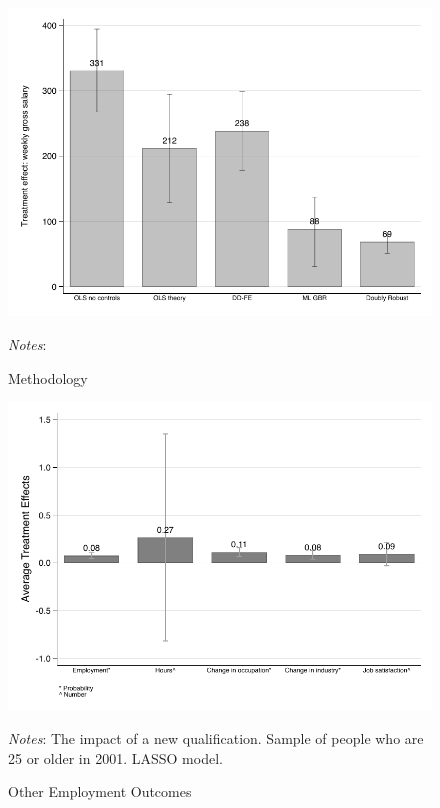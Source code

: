\documentclass[12pt, a4paper]{article}
\begin{document}



\clearpage

\begin{figure}[htbp]
\centering
\caption{Methodology}
\vspace{0.5cm}
  \label{fig:method}
    \includegraphics{_figures/method_v2.pdf}
\parbox{1\textwidth}{\footnotesize{\textit{Notes}: }}
\end{figure}

\begin{figure}[htbp]
\centering
\caption{Other Employment Outcomes}
\vspace{0.5cm}
  \label{fig:empl}
    \includegraphics{_figures/SPRC_fig5_empltr.pdf}
\parbox{1\textwidth}{\footnotesize{\textit{Notes}: The impact of a new qualification. Sample of people who are 25 or older in 2001. LASSO model.}}
\end{figure}
\end{document}

